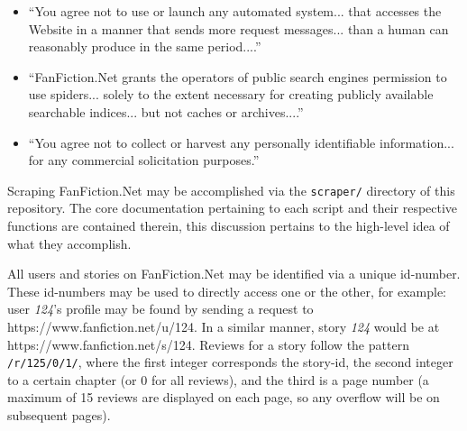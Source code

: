 \documentclass[letterpaper]{article}
\begin{document}
\begin{itemize}
    \item ``You agree not to use or launch any automated system... that accesses the Website in a manner that sends more request messages... than a human can reasonably produce in the same period....''
    \item ``FanFiction.Net grants the operators of public search engines permission to use spiders... solely to the extent necessary for creating publicly available searchable indices... but not caches or archives....''
    \item ``You agree not to collect or harvest any personally identifiable information... for any commercial solicitation purposes.''
\end{itemize}

Scraping FanFiction.Net may be accomplished via the \texttt{scraper/} directory of this repository. The core documentation pertaining to each script and their respective functions are contained therein, this discussion pertains to the high-level idea of what they accomplish.

All users and stories on FanFiction.Net may be identified via a unique id-number. These id-numbers may be used to directly access one or the other, for example: user \textit{124}'s profile may be found by sending a request to https://www.fanfiction.net/u/124. In a similar manner, story \textit{124} would be at https://www.fanfiction.net/s/124. Reviews for a story follow the pattern \texttt{/r/125/0/1/}, where the first integer corresponds the story-id, the second integer to a certain chapter (or 0 for all reviews), and the third is a page number (a maximum of 15 reviews are displayed on each page, so any overflow will be on subsequent pages).



\end{document}
